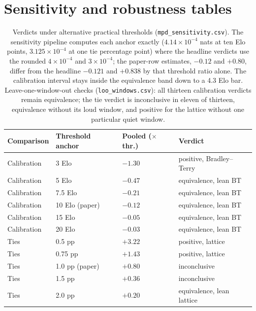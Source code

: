 \documentclass[10pt]{article}
\begin{document}
\section{Sensitivity and robustness tables}\label{app:sens}

\begin{table}[h]
\centering
\small
\begin{tabular}{llll}
\toprule
Comparison & Threshold anchor & Pooled ($\times$thr.) & Verdict \\
\midrule
Calibration & 3 Elo & $-1.30$ & positive, Bradley--Terry \\
Calibration & 5 Elo & $-0.47$ & equivalence, lean BT \\
Calibration & 7.5 Elo & $-0.21$ & equivalence, lean BT \\
Calibration & 10 Elo (paper) & $-0.12$ & equivalence, lean BT \\
Calibration & 15 Elo & $-0.05$ & equivalence, lean BT \\
Calibration & 20 Elo & $-0.03$ & equivalence, lean BT \\
\midrule
Ties & 0.5 pp & $+3.22$ & positive, lattice \\
Ties & 0.75 pp & $+1.43$ & positive, lattice \\
Ties & 1.0 pp (paper) & $+0.80$ & inconclusive \\
Ties & 1.5 pp & $+0.36$ & inconclusive \\
Ties & 2.0 pp & $+0.20$ & equivalence, lean lattice \\
\bottomrule
\end{tabular}
\caption{Verdicts under alternative practical thresholds
(\texttt{mpd\_sensitivity.csv}). The sensitivity pipeline computes
each anchor exactly ($4.14 \times 10^{-4}$ nats at ten Elo points,
$3.125 \times 10^{-4}$ at one tie percentage point) where the
headline verdicts use the rounded $4 \times 10^{-4}$ and $3 \times
10^{-4}$; the paper-row estimates, $-0.12$ and $+0.80$, differ from
the headline $-0.121$ and $+0.838$ by that threshold ratio alone.
The calibration interval stays inside
the equivalence band down to a 4.3 Elo bar. Leave-one-window-out
checks (\texttt{loo\_windows.csv}): all thirteen calibration verdicts
remain equivalence; the tie verdict is inconclusive in eleven of
thirteen, equivalence without its loud window, and positive for the
lattice without one particular quiet window.}
\end{table}
\end{document}
